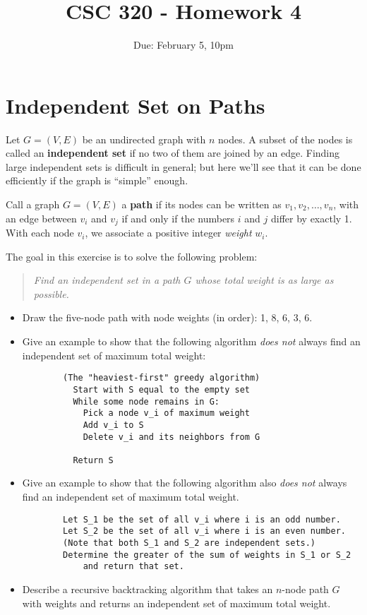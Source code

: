 \documentclass[12pt]{article}
\title{CSC 320 - Homework 4}
\author{}
\date{Due: February 5, 10pm}
\begin{document}

\section{Independent Set on Paths}

Let $G = (V, E)$ be an undirected graph with $n$ nodes. A subset of the nodes is called an \textbf{independent set} if no two of them are joined by an edge. Finding large independent sets is difficult in general; but here we'll see that it can be done efficiently if the graph is ``simple'' enough.

Call a graph $G = (V, E)$ a \textbf{path} if its nodes can be written as $v_1, v_2, \ldots, v_n$, with an edge between $v_i$ and $v_j$ if and only if the numbers $i$ and $j$ differ by exactly 1. With each node $v_i$, we associate a positive integer \emph{weight} $w_i$. 

The goal in this exercise is to solve the following problem:

\begin{quotation}\it
    Find an independent set in a path $G$ whose total weight is as large as possible.
\end{quotation}

\begin{itemize}
    \item Draw the five-node path with node weights (in order): 1, 8, 6, 3, 6.
    \item Give an example to show that the following algorithm \emph{does not} always find an independent set of maximum total weight:
    
    \begin{verbatim}
        (The "heaviest-first" greedy algorithm)
          Start with S equal to the empty set
          While some node remains in G:
            Pick a node v_i of maximum weight
            Add v_i to S
            Delete v_i and its neighbors from G

          Return S
    \end{verbatim}

    \item Give an example to show that the following algorithm also \emph{does not} always find an independent set of maximum total weight.
    
    \begin{verbatim}
        Let S_1 be the set of all v_i where i is an odd number.
        Let S_2 be the set of all v_i where i is an even number.
        (Note that both S_1 and S_2 are independent sets.)
        Determine the greater of the sum of weights in S_1 or S_2 
            and return that set.
    \end{verbatim}

    \item Describe a recursive backtracking algorithm that takes an $n$-node path $G$ with weights and returns an independent set of maximum total weight. 
\end{itemize}
\end{document}
